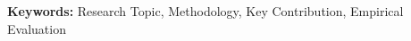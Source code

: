 \begin{abstract}
State the primary problem, proposed approach, key findings, and empirical impact in one cohesive paragraph. Ensure all major claims align directly with the experimental results.
\end{abstract}

\vspace{0.8em}
\noindent
\textbf{Keywords:} Research Topic, Methodology, Key Contribution, Empirical Evaluation
